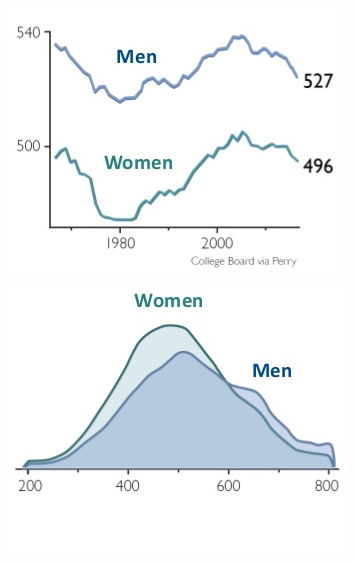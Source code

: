 \documentclass[12pt]{book} %
\begin{document}
\begin{figure}[H]
    \begin{minipage}{0.3\textwidth}
        \centering
        \includegraphics[width=\linewidth]{images/Libro-img003.jpg}
    \end{minipage}
    \hfill
    \begin{minipage}{0.3\textwidth}
        \centering
        \includegraphics[width=\linewidth]{images/Libro-img004.jpg}
    \end{minipage}
    \hfill
    \begin{minipage}{0.3\textwidth}
        \centering

\end{minipage}
\end{figure}
\end{document}

